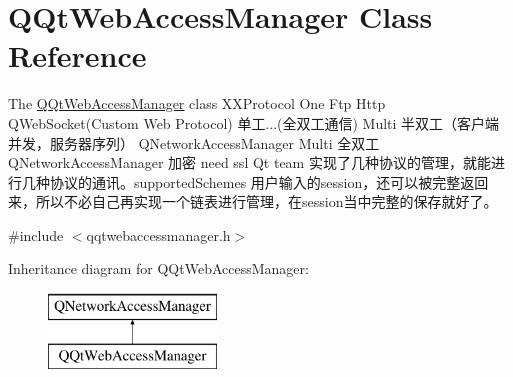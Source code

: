\hypertarget{class_q_qt_web_access_manager}{}\section{Q\+Qt\+Web\+Access\+Manager Class Reference}
\label{class_q_qt_web_access_manager}


The \mbox{\hyperlink{class_q_qt_web_access_manager}{Q\+Qt\+Web\+Access\+Manager}} class X\+X\+Protocol One Ftp Http Q\+Web\+Socket(\+Custom Web Protocol) 单工...(全双工通信) Multi 半双工（客户端并发，服务器序列） Q\+Network\+Access\+Manager Multi 全双工 Q\+Network\+Access\+Manager 加密 need ssl Qt team 实现了几种协议的管理，就能进行几种协议的通讯。supported\+Schemes 用户输入的session，还可以被完整返回来，所以不必自己再实现一个链表进行管理，在session当中完整的保存就好了。  




{\ttfamily \#include $<$qqtwebaccessmanager.\+h$>$}

Inheritance diagram for Q\+Qt\+Web\+Access\+Manager\+:\begin{figure}[H]
\begin{center}
\leavevmode
\includegraphics[height=2.000000cm]{class_q_qt_web_access_manager}
\end{center}
\end{figure}
